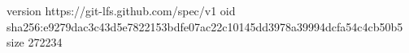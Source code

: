 version https://git-lfs.github.com/spec/v1
oid sha256:e9279dac3c43d5e7822153bdfe07ac22c10145dd3978a39994dcfa54c4cb50b5
size 272234
